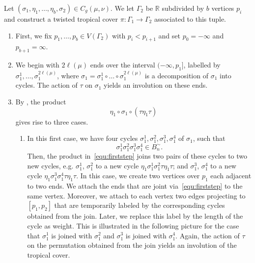 \begin{construction}
\label{con-twist}
Let $(\sigma_1,
\eta_1,\dots,\eta_b,\sigma_2)\in C_g(\mu,\nu)$. We let $\Gamma_2$ be $\mathbb{R}$ subdivided by $b$ vertices $p_i$ and construct a twisted tropical cover $\pi\colon\Gamma_1\to\Gamma_2$ associated to this tuple.

\begin{enumerate}
    \item First, we fix $p_1,\dots,p_b\in V(\Gamma_2)$ with $p_i<p_{i+1}$ and set $p_0=-\infty$ and $p_{b+1}=
    \infty$.
    \item We begin with $2\ell(\mu)$ ends over the interval $(-\infty,p_1]$, labelled by $\sigma_1^1,\dots,\sigma_1^{2\ell(\mu)}$, where $\sigma_1=\sigma_1^1\circ \ldots \circ \sigma_1^{2\ell(\mu)}$ is a decomposition of $\sigma_1$ into cycles. The action of $\tau$ on $\sigma_1$ yields an involution on these ends.
    \item By \cite[Theorem 2.14]{BF21}, the product
    \begin{equation}
    \label{equ:firststep}
        \eta_1\circ\sigma_1\circ(\tau\eta_1\tau) \tag{*}
    \end{equation}
    gives rise to three cases.
    \begin{enumerate}
        \item In this first case, we have four cycles $\sigma_1^1,\sigma_1^2,\sigma_1^3,\sigma_1^4$ of $\sigma_1$, such that
        \begin{equation*}
            \sigma_1^1\sigma_1^2\sigma_1^3\sigma_1^4\in B^{\sim}_n.
        \end{equation*}
        Then, the product in~\eqref{equ:firststep} joins two pairs of these cycles to two new cycles, e.g. $\sigma_1^1$, $\sigma_1^2$ to a new cycle $\eta_1\sigma_1^1\sigma_1^2\tau\eta_1\tau$; and $\sigma_1^3$, $\sigma_1^4$ to a new cycle $\eta_1\sigma_1^3\sigma_1^4\tau\eta_1\tau$.
        In this case, we create two vertices over $p_1$ each adjacent to two ends. We attach the ends that are joint via~\eqref{equ:firststep} to the same vertex. Moreover, we attach to each vertex two edges projecting to $[p_1,p_2]$ that are temporarily labeled by the corresponding cycles obtained from the join. Later, we replace this label by the length of the cycle as weight. This is illustrated in the following picture for the case that $\sigma_1^1$ is joined with $\sigma_1^2$ and $\sigma_1^3$ is joined with $\sigma_1^4$. Again, the action of $\tau$ on the permutation obtained from the join yields an involution of the tropical cover. 
        

\end{enumerate}
\end{enumerate}
\end{construction}
